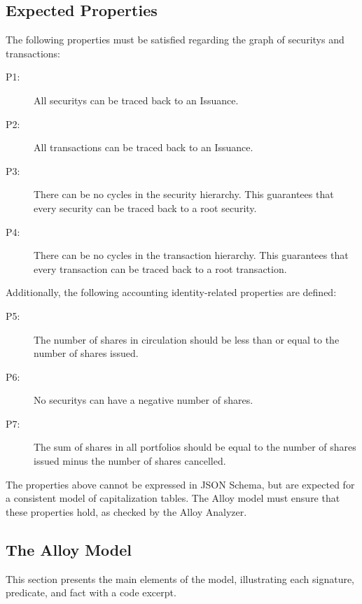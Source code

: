 \subsection{Expected Properties}
\label{sec:exp-properties}

The following properties must be satisfied regarding the graph of \glspl{security} and \glspl{transaction}:


\begin{description}
	\item [P1:] All \glspl{security} can be traced back to an Issuance.
	\item [P2:] All \glspl{transaction} can be traced back to an Issuance.
	\item [P3:] There can be no cycles in the \gls{security} hierarchy. This guarantees that every \gls{security} can be traced back to a root security.
	\item [P4:] There can be no cycles in the transaction hierarchy. This guarantees that every transaction can be traced back to a root transaction.
\end{description}

Additionally, the following accounting identity-related properties are defined:

\begin{description}
	\item [P5:] The number of shares in circulation should be less than or equal to the number of shares issued.
	\item [P6:] No \glspl{security} can have a negative number of shares.
	\item [P7:] The sum of shares in all portfolios should be equal to the number of shares issued minus the number of shares cancelled.
\end{description}

The properties above cannot be expressed in JSON Schema, but are expected for a consistent model of capitalization tables. The Alloy model must ensure that these properties hold, as checked by the Alloy Analyzer.


\subsection{The Alloy Model}

This section presents the main elements of the model, illustrating each signature, predicate, and fact with a code excerpt.

